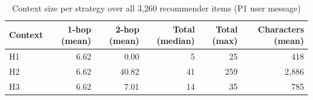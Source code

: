 \begin{table}[H]
\centering
\small
\begin{tabular}{lrrrrr}
\toprule
Context & 1-hop (mean) & 2-hop (mean) & Total (median) & Total (max) & Characters (mean) \\
\midrule
H1 & 6.62 & 0.00 & 5 & 25 & 418 \\
H2 & 6.62 & 40.82 & 41 & 259 & 2,886 \\
H3 & 6.62 & 7.01 & 14 & 35 & 785 \\
\bottomrule
\end{tabular}
\caption{Context size per strategy over all 3,260 recommender items (P1 user message)}
\label{tab:context_sizes}
\end{table}
